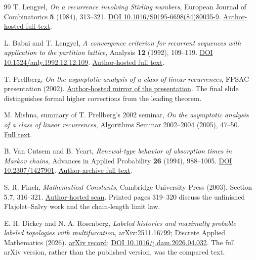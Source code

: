 \documentclass[11pt,letterpaper]{article}
\theoremstyle{definition}\newtheorem{definition}[theorem]{Definition}
\theoremstyle{remark}\newtheorem{remark}[theorem]{Remark}
\begin{document}
\begin{thebibliography}{99}
T. Lengyel, \emph{On a recurrence involving Stirling numbers}, European Journal of Combinatorics \textbf{5} (1984), 313--321.
\href{https://doi.org/10.1016/S0195-6698(84)80035-9}{DOI 10.1016/S0195-6698(84)80035-9}.
\href{https://sites.oxy.edu/lengyel/originals/papers/hivatkozo/81989948\%20On\%20a\%20Recurrence\%20involving\%20Stirling\%20Numbers\%20EuropJComb1984.pdf}{Author-hosted full text}.

L. Babai and T. Lengyel, \emph{A convergence criterion for recurrent sequences with application to the partition lattice}, Analysis \textbf{12} (1992), 109--119.
\href{https://doi.org/10.1524/anly.1992.12.12.109}{DOI 10.1524/anly.1992.12.12.109}.
\href{https://sites.oxy.edu/lengyel/papers/analysis.pdf}{Author-hosted full text}.

T. Prellberg, \emph{On the asymptotic analysis of a class of linear recurrences}, FPSAC presentation (2002).
\href{https://sites.oxy.edu/lengyel/papers/prellberg/recurrence.pdf}{Author-hosted mirror of the presentation}.
The final slide distinguishes formal higher corrections from the leading theorem.

M. Mishna, summary of T. Prellberg's 2002 seminar, \emph{On the asymptotic analysis of a class of linear recurrences}, Algorithms Seminar 2002--2004 (2005), 47--50.
\href{https://sites.oxy.edu/lengyel/papers/prellberg/Prellberg2002a.pdf}{Full text}.

B. Van Cutsem and B. Ycart, \emph{Renewal-type behavior of absorption times in Markov chains}, Advances in Applied Probability \textbf{26} (1994), 988--1005.
\href{https://doi.org/10.2307/1427901}{DOI 10.2307/1427901}.
\href{https://sites.oxy.edu/lengyel/originals/papers/hivatkozo/Renewal-Type\%20Behavior\%20of\%20Absorption\%20Times\%20in\%20MCh\%20VanCutsem_Ycart\%20AdvApplProb94.pdf}{Author-archive full text}.

S. R. Finch, \emph{Mathematical Constants}, Cambridge University Press (2003), Section 5.7, 316--321.
\href{https://sites.oxy.edu/lengyel/originals/MathConst2003.pdf}{Author-hosted scan}.
Printed pages 319--320 discuss the unfinished Flajolet--Salvy work and the chain-length limit law.

E. H. Dickey and N. A. Rosenberg, \emph{Labeled histories and maximally probable labeled topologies with multifurcation}, arXiv:2511.16799; Discrete Applied Mathematics (2026).
\href{https://arxiv.org/abs/2511.16799}{arXiv record};
\href{https://doi.org/10.1016/j.dam.2026.04.032}{DOI 10.1016/j.dam.2026.04.032}.
The full arXiv version, rather than the published version, was the compared text.


\end{thebibliography}
\end{document}
